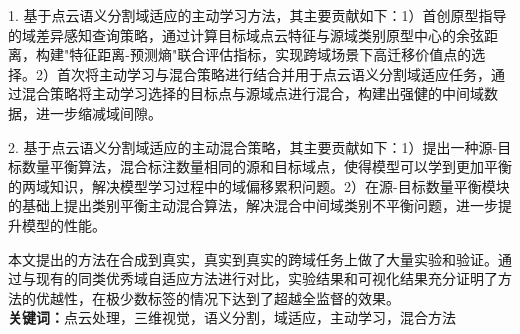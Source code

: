 
1. 基于点云语义分割域适应的主动学习方法，其主要贡献如下：1）首创原型指导的域差异感知查询策略，通过计算目标域点云特征与源域类别原型中心的余弦距离，构建"特征距离-预测熵"联合评估指标，实现跨域场景下高迁移价值点的选择。2）首次将主动学习与混合策略进行结合并用于点云语义分割域适应任务，通过混合策略将主动学习选择的目标点与源域点进行混合，构建出强健的中间域数据，进一步缩减域间隙。

2. 基于点云语义分割域适应的主动混合策略，其主要贡献如下：1）提出一种源-目标数量平衡算法，混合标注数量相同的源和目标域点，使得模型可以学到更加平衡的两域知识，解决模型学习过程中的域偏移累积问题。2）在源-目标数量平衡模块的基础上提出类别平衡主动混合算法，解决混合中间域类别不平衡问题，进一步提升模型的性能。

本文提出的方法在合成到真实，真实到真实的跨域任务上做了大量实验和验证。通过与现有的同类优秀域自适应方法进行对比，实验结果和可视化结果充分证明了方法的优越性，在极少数标签的情况下达到了超越全监督的效果。\\

\noindent\songti\textbf{关键词：}点云处理，三维视觉，语义分割，域适应，主动学习，混合方法

\clearpage